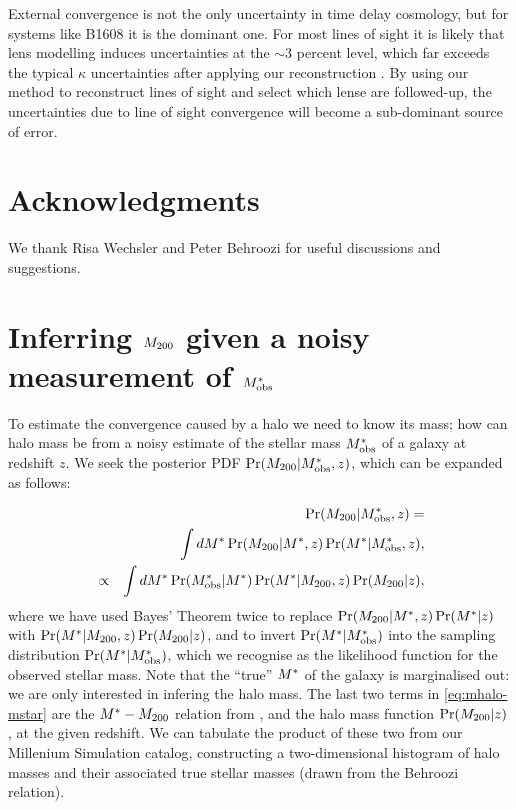 \documentclass[useAMS,usenatbib]{mn2e}
\begin{document}
External convergence is not the only uncertainty in time delay cosmology,
but for systems like B1608 it is the dominant one. For most lines
of sight it is likely that lens modelling induces uncertainties at the
$\sim$3 percent level, which far exceeds the typical $\kappa$ uncertainties
after applying our reconstruction \proceedure. By using our method to
reconstruct lines of sight and select which lense are followed-up, the
uncertainties due to line of sight convergence will become a sub-dominant 
source of error.


\section*{Acknowledgments}
 
We thank Risa Wechsler and Peter Behroozi 
for useful discussions and suggestions.



\appendix


\section{Inferring $M_{200}$ given a noisy measurement of $M^{*}_{\rm obs}$}
\label{appendix:MSMH}

To estimate the convergence caused by a halo we need to know its mass; how can 
halo mass be \infered from a noisy estimate of the stellar mass $M^{*}_{\rm obs}$
of a galaxy at redshift $z$. We seek the posterior
PDF $\Pr(M_{200}|M^{*}_{\rm obs},z)$, which can be expanded as follows:

\begin{eqnarray}
&& \Pr(M_{200}|M^{*}_{\rm obs},z) = \notag\\
&& \int dM^{*} \Pr(M_{200}|M^{*},z) \Pr(M^{*}|M^{*}_{\rm obs},z), \notag\\
&\propto& \int dM^{*} \Pr(M^{*}_{\rm obs}|M^{*}) \Pr(M^{*}|M_{200},z) \Pr(M_{200}|z),
\label{eq:mhalo-mstar}
\end{eqnarray}
where we have used Bayes' Theorem twice to replace
$\Pr(M_{200}|M^{*},z) \Pr(M^{*}|z)$ with 
$\Pr(M^{*}|M_{200},z) \Pr(M_{200}|z)$, and 
to invert $\Pr(M^{*}|M^{*}_{\rm obs})$ into the sampling
distribution $\Pr(M^{*}|M^{*}_{\rm obs})$, which we recognise as the likelihood
function for the observed stellar mass. Note that the ``true'' $M^{*}$ of the
galaxy is marginalised out: we are only interested in infering the halo
mass. The last two terms in
\eqref{eq:mhalo-mstar} are the $M^{*}-M_{200}$ relation from
\citet{BehrooziEtal2010}, and the halo mass function $\Pr(M_{200}|z)$, at the
given redshift. We can
tabulate the product of these two from our Millenium Simulation catalog,
constructing a two-dimensional histogram of halo masses and their associated
true stellar masses (drawn from the Behroozi relation). 
\end{document}
